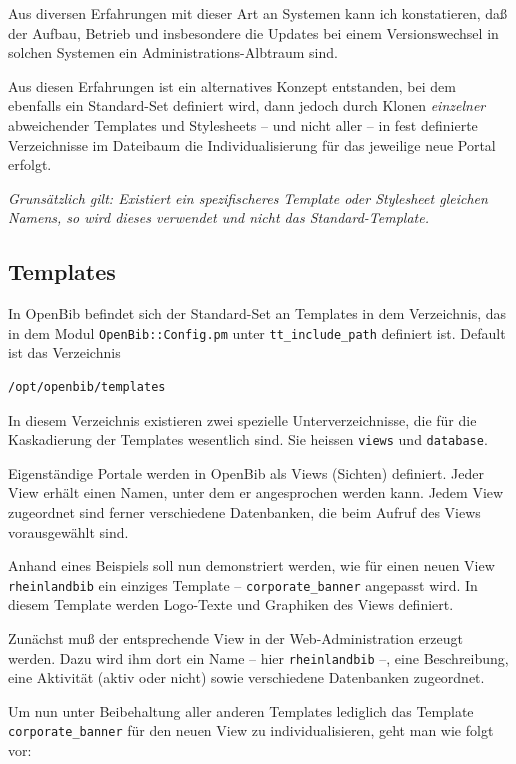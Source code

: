 \documentclass[11pt, twoside, a4paper, BCOR8mm, DIV12, bibtotoc,idxtotoc]{scrbook}
\begin{document}
Aus diversen Erfahrungen mit dieser Art an Systemen kann ich
konstatieren, daß der Aufbau, Betrieb und insbesondere die Updates bei
einem Versionswechsel in solchen Systemen ein Adminis\-tra\-tions-Albtraum
sind.

Aus diesen Erfahrungen ist ein alternatives Konzept entstanden, bei
dem ebenfalls ein Standard-Set definiert wird, dann jedoch durch Klonen
\emph{einzelner} abweichender Templates und Stylesheets -- und nicht
aller -- in fest definierte Verzeichnisse im Dateibaum die
Individualisierung für das jeweilige neue Portal erfolgt.

\emph{Grunsätzlich gilt: Existiert ein spezifischeres Template oder
Stylesheet gleichen Namens, so wird dieses verwendet und nicht das
Standard-Template.}


\subsection{Templates}

In OpenBib befindet sich der Standard-Set an Templates in dem
Verzeichnis, das in dem Modul \texttt{OpenBib::Config.pm} unter
\texttt{tt\_include\_path} definiert ist. Default ist das Verzeichnis
\begin{verbatim}
/opt/openbib/templates
\end{verbatim} 

In diesem Verzeichnis existieren zwei
spezielle Unterverzeichnisse, die für die Kaskadierung der Templates
wesentlich sind. Sie heissen \texttt{views} und \texttt{database}.

Eigenständige Portale werden in OpenBib als Views (Sichten)
definiert. Jeder View erhält einen Namen, unter dem er angesprochen
werden kann. Jedem View zugeordnet sind ferner verschiedene
Datenbanken, die beim Aufruf des Views vorausgewählt sind.

Anhand eines Beispiels soll nun demonstriert werden, wie für einen
neuen View \texttt{rheinlandbib} ein einziges Template --
\texttt{corporate\_banner} angepasst wird. In diesem Template werden
Logo-Texte und Graphiken des Views definiert.

Zunächst muß der entsprechende View in der Web-Administration erzeugt
werden. Dazu wird ihm dort ein Name -- hier \texttt{rheinlandbib} --,
eine Beschreibung, eine Aktivität (aktiv oder nicht) sowie
verschiedene Datenbanken zugeordnet.

Um nun unter Beibehaltung aller anderen Templates lediglich das
Template \texttt{corporate\_banner} für den neuen View zu
individualisieren, geht man wie folgt vor:
\end{document}
